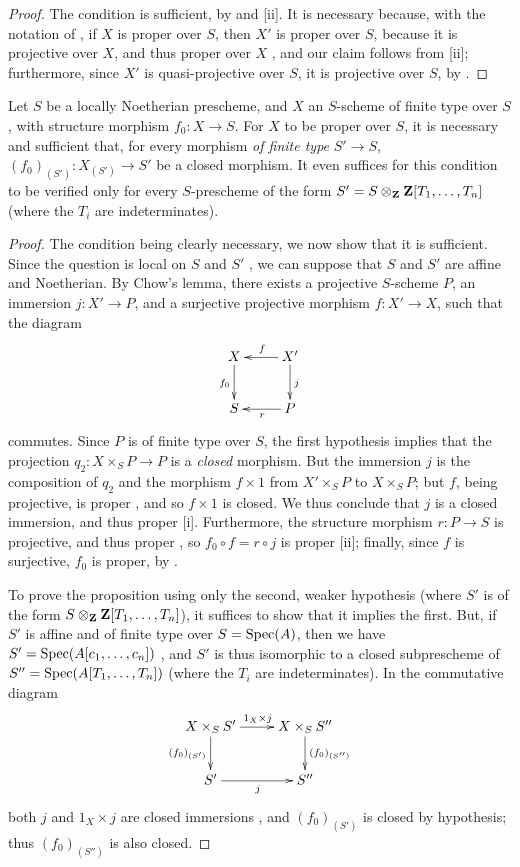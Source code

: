 \begin{proof}
\label{proof-2.5.6.2}
The condition is sufficient, by  and [ii].
It is necessary because, with the notation of , if $X$ is proper over $S$, then $X'$ is proper over $S$, because it is projective over $X$, and thus proper over $X$ , and our claim follows from [ii];
furthermore, since $X'$ is quasi-projective over $S$, it is projective over $S$, by .
\end{proof}

\begin{cor}[5.6.3]
\label{2.5.6.3}
Let $S$ be a locally Noetherian prescheme, and $X$ an $S$-scheme of finite type over $S$, with structure morphism $f_0:X\to S$.
For $X$ to be proper over $S$, it is necessary and sufficient that, for every morphism \emph{of finite type} $S'\to S$, $(f_0)_{(S')}:X_{(S')}\to S'$ be a closed morphism.
It even suffices for this condition to be verified only for every $S$-prescheme of the form $S'=S\otimes_\mathbf{Z}\mathbf{Z}[T_1,\ldots,T_n]$ (where the $T_i$ are indeterminates).
\end{cor}

\begin{proof}
\label{proof-2.5.6.3}
The condition being clearly necessary, we now show that it is sufficient.
Since the question is local on $S$ and $S'$ , we can suppose that $S$ and $S'$ are affine and Noetherian.
By Chow's lemma, there exists a projective $S$-scheme $P$, an immersion $j:X'\to P$, and a surjective projective morphism $f:X'\to X$, such that the diagram
\[
  \xymatrix{
    X \ar[d]_{f_0}
    & X' \ar[l]_f \ar[d]^j\\
    S
    & P \ar[l]^r
  }
\]
commutes.
Since $P$ is of finite type over $S$, the first hypothesis implies that the projection $q_2:X\times_S P\to P$ is a \emph{closed} morphism.
But the immersion $j$ is the composition of $q_2$ and the morphism $f\times1$ from $X'\times_S P$ to $X\times_S P$;
but $f$, being projective, is proper , and so $f\times1$ is closed.
We thus conclude that $j$ is a closed immersion, and thus proper [i].
Furthermore, the structure morphism $r:P\to S$ is projective, and thus proper , so $f_0\circ f=r\circ j$ is proper [ii];
finally, since $f$ is surjective, $f_0$ is proper, by .

To prove the proposition using only the second, weaker hypothesis (where $S'$ is of the form $S\otimes_\mathbf{Z}\mathbf{Z}[T_1,\ldots,T_n]$), it suffices to show that it implies the first.
But, if $S'$ is affine and of finite type over $S={\mathop{\mathrm{Spec}}\nolimits}(A)$,
then we have $S'={\mathop{\mathrm{Spec}}\nolimits}(A[c_1,\ldots,c_n])$ , and $S'$ is thus isomorphic to a closed subprescheme of $S''={\mathop{\mathrm{Spec}}\nolimits}(A[T_1,\ldots,T_n])$ (where the $T_i$ are indeterminates).
In the commutative diagram
\[
  \xymatrix{
    X\times_S S' \ar[r]^{1_X\times j} \ar[d]_{(f_0)_{(S')}}
    & X\times_S S'' \ar[d]^{(f_0)_{(S'')}}\\
    S' \ar[r]_j
    & S''
  }
\]
both $j$ and $1_X\times j$ are closed immersions , and $(f_0)_{(S')}$ is closed by hypothesis;
thus $(f_0)_{(S'')}$ is also closed.
\end{proof}
